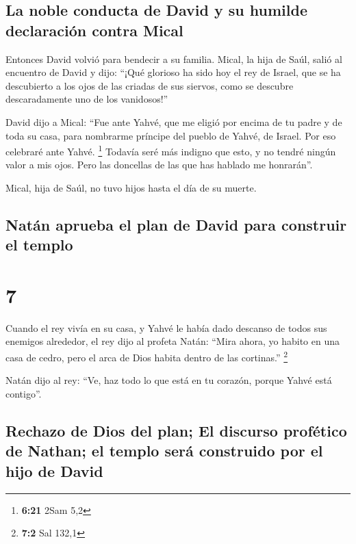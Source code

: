 \hypertarget{la-noble-conducta-de-david-y-su-humilde-declaraciuxf3n-contra-mical}{%
\subsection{La noble conducta de David y su humilde declaración contra
Mical}\label{la-noble-conducta-de-david-y-su-humilde-declaraciuxf3n-contra-mical}}

 Entonces David volvió para bendecir a su familia. Mical,
la hija de Saúl, salió al encuentro de David y dijo: ``¡Qué glorioso ha
sido hoy el rey de Israel, que se ha descubierto a los ojos de las
criadas de sus siervos, como se descubre descaradamente uno de los
vanidosos!''

 David dijo a Mical: ``Fue ante Yahvé, que me eligió por
encima de tu padre y de toda su casa, para nombrarme príncipe del pueblo
de Yahvé, de Israel. Por eso celebraré ante Yahvé. \footnote{\textbf{6:21}
  2Sam 5,2}  Todavía seré más indigno que esto, y no
tendré ningún valor a mis ojos. Pero las doncellas de las que has
hablado me honrarán''.

 Mical, hija de Saúl, no tuvo hijos hasta el día de su
muerte.

\hypertarget{natuxe1n-aprueba-el-plan-de-david-para-construir-el-templo}{%
\subsection{Natán aprueba el plan de David para construir el
templo}\label{natuxe1n-aprueba-el-plan-de-david-para-construir-el-templo}}

\hypertarget{section-6}{%
\section{7}\label{section-6}}

 Cuando el rey vivía en su casa, y Yahvé le había dado
descanso de todos sus enemigos alrededor,  el rey dijo al
profeta Natán: ``Mira ahora, yo habito en una casa de cedro, pero el
arca de Dios habita dentro de las cortinas.'' \footnote{\textbf{7:2} Sal
  132,1}

 Natán dijo al rey: ``Ve, haz todo lo que está en tu
corazón, porque Yahvé está contigo''.

\hypertarget{rechazo-de-dios-del-plan-el-discurso-profuxe9tico-de-nathan-el-templo-seruxe1-construido-por-el-hijo-de-david}{%
\subsection{Rechazo de Dios del plan; El discurso profético de Nathan;
el templo será construido por el hijo de
David}\label{rechazo-de-dios-del-plan-el-discurso-profuxe9tico-de-nathan-el-templo-seruxe1-construido-por-el-hijo-de-david}}


